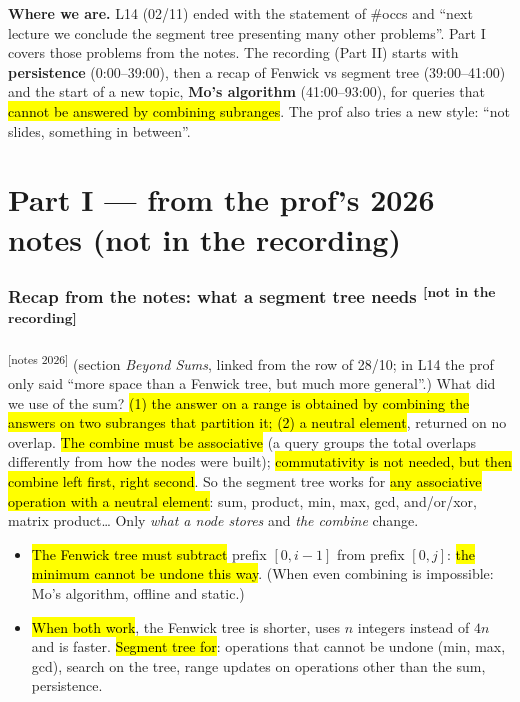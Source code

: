 \documentclass[11pt,a4paper]{article}
\theoremstyle{definition}\newtheorem*{definition}{Definition}
\newcommand{\hly}[1]{{\sethlcolor{hlY}\hl{#1}}}
\newcommand{\hlg}[1]{{\sethlcolor{hlG}\hl{#1}}}
\newcommand{\hlp}[1]{{\sethlcolor{hlP}\hl{#1}}}
\newcommand{\hlb}[1]{{\sethlcolor{hlB}\hl{#1}}}
\newcommand{\nt}{\textsuperscript{\textcolor{accent}{[notes 2026]}}}
\newcommand{\nrec}{\textsuperscript{\textcolor{warn}{[not in the recording]}}}
\begin{document}
\begin{keybox}[colback=gray!4,colframe=gray!60]
\textbf{Where we are.} L14 (02/11) ended with the statement of \#occs and ``next lecture we conclude the segment tree presenting many other problems''. Part I covers those problems from the notes.
The recording (Part II) starts with \textbf{persistence} (0:00--39:00), then a recap of Fenwick vs segment tree (39:00--41:00) and the start of a new topic, \textbf{Mo's algorithm} (41:00--93:00),
for queries that \hlp{cannot be answered by combining subranges}. The prof also tries a new style: ``not slides, something in between''.
\end{keybox}

\tableofcontents

\part*{Part I --- from the prof's 2026 notes (not in the recording)}

\section{Recap from the notes: what a segment tree needs \nrec}
\nt{} (section \emph{Beyond Sums}, linked from the row of 28/10; in L14 the prof only said ``more space than a Fenwick tree, but much more general''.)
What did we use of the sum? \hlb{(1) the answer on a range is obtained by combining the answers on two subranges that partition it; (2) a neutral element}, returned on no overlap.
\hlb{The combine must be associative} (a query groups the total overlaps differently from how the nodes were built); \hly{commutativity is not needed, but then combine left first, right second}.
So the segment tree works for \hlg{any associative operation with a neutral element}: sum, product, min, max, gcd, and/or/xor, matrix product\ldots{} Only \emph{what a node stores} and \emph{the combine} change.
\begin{itemize}[nosep]
\item \hlp{The Fenwick tree must subtract} prefix $[0,i-1]$ from prefix $[0,j]$: \hlp{the minimum cannot be undone this way}. (When even combining is impossible: Mo's algorithm, offline and static.)
\item \hly{When both work}, the Fenwick tree is shorter, uses $n$ integers instead of $4n$ and is faster. \hly{Segment tree for}: operations that cannot be undone (min, max, gcd), search on the tree,
      range updates on operations other than the sum, persistence.
\end{itemize}
\end{document}
